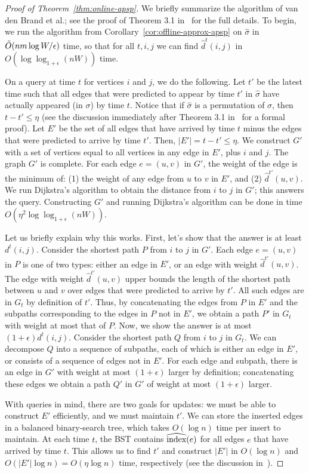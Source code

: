 \begin{proof}[Proof of  Theorem~\ref{thm:online-apsp}]
We briefly summarize the algorithm of van den Brand et al.; see the proof of Theorem 3.1 in~\cite{BrandFNP24} for the full details.  
To begin, we run the algorithm from Corollary~\ref{cor:offline-approx-apsp} on $\hat{\sigma}$ in $\Tilde{O}(nm\log W / \epsilon)$ time, so that for all $t,i,j$ we can find $\hat{d}^t(i,j)$ in $O(\log \log_{1 + \epsilon} (nW))$ time.  

On a query at time $t$ for vertices $i$ and $j$, we do the following.  Let $t'$ be the latest time such that all edges that were predicted to appear by time $t'$ in $\hat{\sigma}$ have actually appeared (in $\sigma$) by time $t$.  Notice that if $\hat{\sigma}$ is a permutation of $\sigma$, then $t - t' \leq \eta$ (see the discussion immediately after Theorem 3.1 in~\cite{BrandFNP24} for a formal proof).  
Let $E'$ be the set of all edges that have arrived by time $t$ minus the edges that were predicted to arrive by time $t'$. Then, $|E'| = t - t' \leq \eta$. 
We construct $G'$ with a set of vertices equal to all vertices in any edge in $E'$, plus $i$ and $j$.  The graph $G'$ is complete.  For each edge $e = (u,v)$ in $G'$, the weight of the edge is the minimum of: (1) the weight of any edge from $u$ to $v$ in $E'$, and (2) $\hat{d}^{t'}(u,v)$.  We run Dijkstra's algorithm to obtain the distance from $i$ to $j$ in $G'$; this answers the query.  Constructing $G'$ and running Dijkstra's algorithm can be done in time $O(\eta^2 \log\log_{1 + \epsilon} (nW))$.

Let us briefly explain why this works.  
First, let's show that the answer is at least $d^t(i,j)$.  
Consider the shortest path $P$ from $i$ to $j$ in $G'$.  
Each edge $e = (u,v)$ in $P$ is one of two types: either an edge in $E'$, or an edge with weight $\hat{d}^{t'}(u,v)$.  The edge with weight $\hat{d}^{t'}(u,v)$ upper bounds the length of the shortest path between $u$ and $v$ over edges that were predicted to arrive by $t'$.  All such edges are in $G_t$ by definition of $t'$.  
Thus, by concatenating the edges from $P$ in $E'$ and the subpaths corresponding to the edges in $P$ not in $E'$, we obtain a path $P'$ in $G_t$ with weight at most that of $P$.
Now, we show the answer is at most $(1 + \epsilon)d^t(i,j)$.
Consider the shortest path $Q$ from $i$ to $j$ in $G_t$.  
We can decompose $Q$ into a sequence of subpaths, each of which is either an edge in $E'$, or consists of a sequence of edges not in $E'$.  For each edge and subpath, there is an edge in $G'$ with weight at most $(1+\epsilon)$ larger by definition; concatenating these edges we obtain a path $Q'$ in $G'$ of weight at most $(1 + \epsilon)$ larger.

With queries in mind, there are two goals for updates: we must be able to construct $E'$ efficiently, and we must maintain $t'$. 
We can store the inserted edges in a balanced binary-search tree, which takes $O(\log n)$ time per insert to maintain. At each time $t$, the BST contains $\widehat{\text{index}}(e)$ for all edges $e$ that have arrived by time $t$. This allows us to find $t'$ and construct $|E'|$ in $O(\log n)$ and $O(|E'| \log n) = O(\eta \log n)$ time, respectively (see the discussion in~\cite[Theorem 3.1]{BrandFNP24}).
\end{proof}